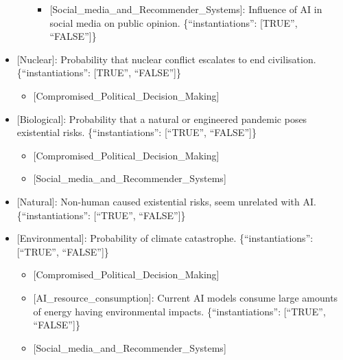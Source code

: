 \documentclass[
  11pt,
  letterpaper,
]{book}
\providecommand{\tightlist}{%
  \setlength{\itemsep}{0pt}\setlength{\parskip}{0pt}}
\begin{document}
\begin{itemize}
\begin{itemize}
    \begin{itemize}
    \tightlist
    \item
      {[}Social\_media\_and\_Recommender\_Systems{]}: Influence of AI in
      social media on public opinion. \{``instantiations'': {[}TRUE'',
      ``FALSE''{]}\}
    \end{itemize}
  \end{itemize}
\item
  {[}Nuclear{]}: Probability that nuclear conflict escalates to end
  civilisation. \{``instantiations'': {[}TRUE'', ``FALSE''{]}\}

  \begin{itemize}
  \tightlist
  \item
    {[}Compromised\_Political\_Decision\_Making{]}
  \end{itemize}
\item
  {[}Biological{]}: Probability that a natural or engineered pandemic
  poses existential risks. \{``instantiations'': {[}``TRUE'',
  ``FALSE''{]}\}

  \begin{itemize}
  \tightlist
  \item
    {[}Compromised\_Political\_Decision\_Making{]}
  \item
    {[}Social\_media\_and\_Recommender\_Systems{]}
  \end{itemize}
\item
  {[}Natural{]}: Non-human caused existential risks, seem unrelated with
  AI. \{``instantiations'': {[}``TRUE'', ``FALSE''{]}\}
\item
  {[}Environmental{]}: Probability of climate catastrophe.
  \{``instantiations'': {[}``TRUE'', ``FALSE''{]}\}

  \begin{itemize}
  \tightlist
  \item
    {[}Compromised\_Political\_Decision\_Making{]}
  \item
    {[}AI\_resource\_consumption{]}: Current AI models consume large
    amounts of energy having environmental impacts.
    \{``instantiations'': {[}``TRUE'', ``FALSE''{]}\}
  \item
    {[}Social\_media\_and\_Recommender\_Systems{]}
  \end{itemize}
\end{itemize}


\backmatter
\printbibliography[title=Bibliography]



\clearpage
\thispagestyle{empty} %
\end{document}
